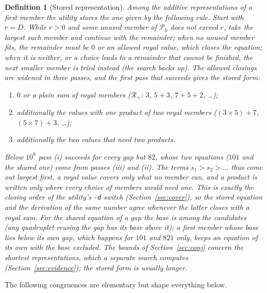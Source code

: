 \documentclass[11pt,a4paper]{article}
\newtheorem{definition}{Definition}
\newcommand{\Pool}{\mathcal{P}}
\newcommand{\Radd}{\mathcal{R}_{+}}
\newcommand{\code}[1]{\texttt{#1}}
\begin{document}
\begin{definition}[Stored representation]
\label{def:canon}
Among the additive representations of a first member the utility stores
the one given by the following rule. Start with $r=D$. While $r>0$ and
some unused member of $\Pool_k$ does not exceed $r$, take the largest such
member and continue with the remainder; when no unused member fits, the
remainder must be $0$ or an \emph{allowed} royal value, which closes the
equation; when it is neither, or a choice leads to a remainder that cannot
be finished, the next smaller member is tried instead (the search backs
up). The allowed closings are widened in three passes, and the first pass
that succeeds gives the stored form:
\begin{enumerate}[label=(\roman*),nosep]
\item $0$ or a plain sum of royal members ($\Radd$: $3$, $5+3$, $7+5+2$, \dots);
\item additionally the values with one product of two royal members
($(3\times5)+7$, $(5\times7)+3$, \dots);
\item additionally the two values that need two products.
\end{enumerate}
Below $10^9$ pass (i) succeeds for every gap but $82$, whose two
equations ($101$ and the shared one) come from passes (iii) and (ii).
The terms $s_1>s_2>\dots$ thus come out largest first, a royal value
covers only what no member can, and a product is written only where every
choice of members would need one. This is exactly the closing order of
the utility's \code{-d} switch (Section~\ref{sec:cover}), so the stored
equation and the derivation of the same number agree whenever the latter
closes with a royal sum. For the shared equation of a gap the base is
among the candidates (any quadruplet reusing the gap has its base above
it); a first member whose base lies below its own gap, which happens for
$101$ and $821$ only, keeps an equation of its own with the base
excluded. The bounds of Section~\ref{sec:conj} concern the
\emph{shortest} representations, which a separate search computes
(Section~\ref{sec:evidence}); the stored form is usually longer.
\end{definition}

The following congruences are elementary but shape everything below.
\end{document}
